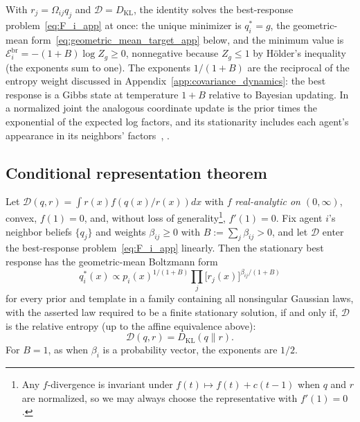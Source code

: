With $r_j = \Omega_{ij}q_j$ and $\mathcal{D} = D_{\mathrm{KL}}$, the identity solves the best-response problem~\eqref{eq:F_i_app} at once: the unique minimizer is $q_i^* = g$, the geometric-mean form~\eqref{eq:geometric_mean_target_app} below, and the minimum value is $\mathcal E_i^{\mathrm{br}} = -(1+B)\log Z_g \geq 0$, nonnegative because $Z_g \leq 1$ by H\"older's inequality (the exponents sum to one). The exponents $1/(1+B)$ are the reciprocal of the entropy weight discussed in Appendix~\ref{app:covariance_dynamics}: the best response is a Gibbs state at temperature $1+B$ relative to Bayesian updating. In a normalized joint the analogous coordinate update is the prior times the exponential of the expected log factors, and its stationarity includes each agent's appearance in its neighbors' factors~\cite[\S10.1]{Bishop2006}, \cite{Blei2017}.

\subsection*{Conditional representation theorem}

\begin{theorem}\label{thm:representation_app}
Let\/ $\mathcal{D}(q,r) = \int r(x)f(q(x)/r(x))dx$ with $f$ \emph{real-analytic on $(0, \infty)$}, convex, $f(1)=0$, and, without loss of generality\footnote{Any $f$-divergence is invariant under $f(t)\mapsto f(t)+c(t-1)$ when $q$ and $r$ are normalized, so we may always choose the representative with $f'(1)=0$.}, $f'(1)=0$. Fix agent $i$'s neighbor beliefs $\{q_j\}$ and weights $\beta_{ij} \geq 0$ with $B := \sum_j \beta_{ij} > 0$, and let $\mathcal{D}$ enter the best-response problem~\eqref{eq:F_i_app} linearly. Then the stationary best response has the geometric-mean Boltzmann form
\begin{equation}
q_i^*(x) \propto p_i(x)^{1/(1+B)}\prod_{j}\bigl[r_j(x)\bigr]^{\beta_{ij}/(1+B)}
\label{eq:geometric_mean_target_app}
\end{equation}
for every prior and template in a family containing all nonsingular Gaussian laws, with the asserted law required to be a finite stationary solution, if and only if, $\mathcal{D}$ is the relative entropy (up to the affine equivalence above):
\[
\mathcal{D}(q,r) = D_{\mathrm{KL}}(q\|r).
\]
For $B = 1$, as when $\beta_i$ is a probability vector, the exponents are $1/2$.
\end{theorem}

